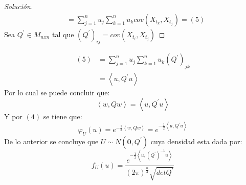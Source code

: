 \documentclass[11pt,notitlepage]{article}
\newenvironment{solucion}
  {\begin{proof}[Solución]}
  {\end{proof}}
\begin{document}
\begin{itemize}
\begin{solucion}
\begin{align*}
                                      &=\sum_{j=1}^{n}u_j\sum_{k=1}^{n}u_kcov(X_{t_{k}},X_{t_{j}})= (5) 
 \end{align*}
 Sea \(Q^{'} \in M_{nxn}\) tal que \((Q^{'})_{ij} = cov(X_{t_{i}},X_{t_{j}})\)
  \end{solucion}
  \begin{align*}
                (5) &=   \sum_{j=1}^{n}u_j\sum_{k=1}^{n}u_k(Q^{'})_{jk}   \\
                    &= \left \langle u,Q^{'}u \right \rangle 
  \end{align*}
  Por lo cual se puede concluir que: 
  \[\left \langle w,Qw \right \rangle = \left \langle u,Q^{'}u \right \rangle \]
  Y por \((4)\) se tiene que: 
  \[ \varphi_{U}(u) = e^{-\frac{1}{2}\left \langle w,Qw \right \rangle} = e^{-\frac{1}{2}\left \langle u,Q^{'}u \right \rangle} \]
  De lo anterior se concluye que \(U \sim N(\mathbf{0},Q^{'})\) cuya densidad esta dada por: 
  \[f_{U}(u) = \frac{e^{-\frac{1}{2}\left \langle u,(Q^{'})^{-1}u \right \rangle}}{(2\pi)^{\frac{n}{2}}\sqrt{detQ^{'}}}\]
\end{itemize}
\end{document}
